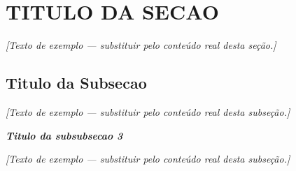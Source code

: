\section{TITULO DA SECAO}\label{sec:proposta}
\textit{[Texto de exemplo --- substituir pelo conteúdo real desta seção.]}

\subsection{Titulo da Subsecao}\label{subsec:proposta}
\textit{[Texto de exemplo --- substituir pelo conteúdo real desta subseção.]}

\noindent\textbf{\textit{Titulo da subsubsecao 3}}

\textit{[Texto de exemplo --- substituir pelo conteúdo real desta subseção.]}
